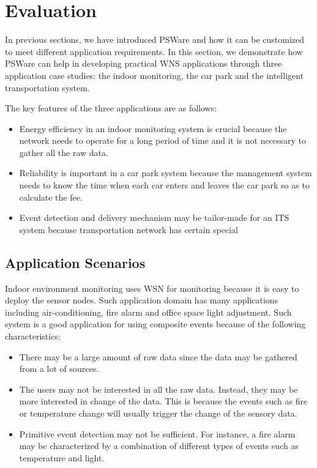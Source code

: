 \section{Evaluation}
\label{sec:pswareImpl}
In previous sections, we have introduced PSWare and how it can be customized to meet different application requirements. In this section, we demonstrate how PSWare can help in developing practical WNS applications through three application case studies: the indoor monitoring, the car park and the intelligent transportation system.

The key features of the three applications are as follows:
\begin{itemize}
\item Energy efficiency in an indoor monitoring system is crucial because the network needs to operate for a long period of time and it is not necessary to gather all the raw data.
\item Reliability is important in a car park system because the management system needs to know the time when each car enters and leaves the car park so as to calculate the fee.
\item Event detection and delivery mechanism may be tailor-made for an ITS system because transportation network has certain special 
\end{itemize}

\subsection{Application Scenarios}
Indoor environment monitoring uses WSN for monitoring because it is easy to deploy the sensor nodes. Such application domain has many applications including air-conditioning, fire alarm and office space light adjustment. Such system is a good application for using composite events because of the following characteristics:
\begin{itemize}
\item There may be a large amount of raw data since the data may be gathered from a lot of sources.
\item The users may not be interested in all the raw data. Instead, they may be more interested in change of the data. This is because the events such as fire or temperature change will usually trigger the change of the sensory data. 
\item Primitive event detection may not be sufficient. For instance, a fire alarm may be characterized by a combination of different types of events such as temperature and light.
\end{itemize}

